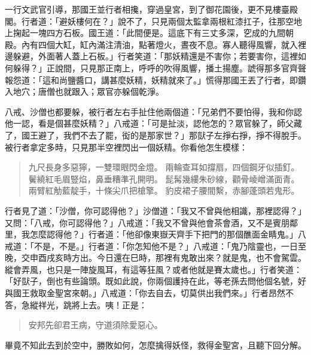 一行文武官引導，那國王並行者相攙，穿過皇宮，到了御花園後，更不見樓臺殿閣。行者道：「避妖樓何在？」說不了，只見兩個太監拿兩根紅漆扛子，往那空地上掬起一塊四方石板。國王道：「此間便是。這底下有三丈多深，穵成的九間朝殿。內有四個大缸，缸內滿注清油，點著燈火，晝夜不息。寡人聽得風響，就入裡邊躲避，外面著人蓋上石板。」行者笑道：「那妖精還是不害你；若要害你，這裡如何躲得？」正說間，只見那正南上，呼呼的吹得風響，播土揚塵。諕得那多官齊聲報怨道：「這和尚鹽醬口，講甚麼妖精，妖精就來了。」慌得那國王丟了行者，即鑽入地穴；唐僧也就跟入；眾官亦躲個乾淨。

八戒、沙僧也都要躲，被行者左右手扯住他兩個道：「兄弟們不要怕得，我和你認他一認，看是個甚麼妖精？」八戒道：「可是扯淡，認他怎的？眾官躲了，師父藏了，國王避了，我們不去了罷，衒的是那家世？」那獃子左掙右掙，掙不得脫手。被行者拿定多時，只見那半空裡閃出一個妖精。你看他怎生模樣：
\begin{quote}
九尺長身多惡獰，一雙環眼閃金燈。
兩輪查耳如撐扇，四個鋼牙似插釘。
鬢繞紅毛眉豎焰，鼻垂糟準孔開明。
髭髯幾縷朱砂線，顴骨崚嶒滿面青。
兩臂紅觔藍靛手，十條尖爪把槍擎。
豹皮裙子腰間繫，赤腳蓬頭若鬼形。
\end{quote}

行者見了道：「沙僧，你可認得他？」沙僧道：「我又不曾與他相識，那裡認得？」又問：「八戒，你可認得他？」八戒道：「我又不曾與他會茶會酒，又不是賓朋鄰里，我怎麼認得他？」行者道：「他卻像東嶽天齊手下把門的那個醮面金睛鬼。」八戒道：「不是，不是。」行者道：「你怎知他不是？」八戒道：「鬼乃陰靈也，一日至晚，交申酉戌亥時方出。今日還在巳時，那裡有鬼敢出來？就是鬼，也不會駕雲。縱會弄風，也只是一陣旋風耳，有這等狂風？或者他就是賽太歲也。」行者笑道：「好獃子，倒也有些論頭。既如此說，你兩個護持在此，等老孫去問他個名號，好與國王救取金聖宮來朝。」八戒道：「你去自去，切莫供出我們來。」行者昂然不答，急縱祥光，跳將上去。咦！正是：
\begin{quote}
安邦先卻君王病，守道須除愛惡心。
\end{quote}

畢竟不知此去到於空中，勝敗如何，怎麼擒得妖怪，救得金聖宮，且聽下回分解。
